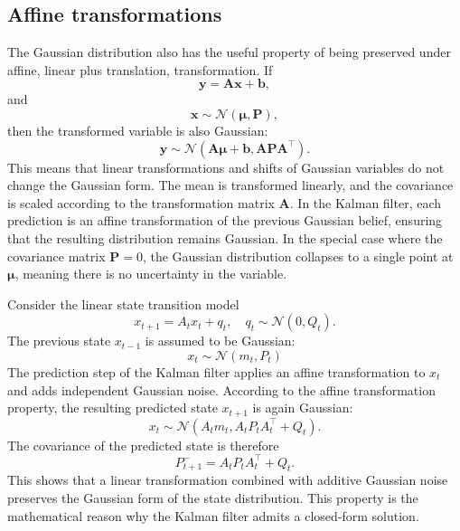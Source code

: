 \subsection*{Affine transformations}
The Gaussian distribution also has the useful property of being preserved under affine, linear plus translation, transformation. If 
\[
\mathbf{y} = \mathbf{A}\mathbf{x}+ \mathbf{b},
\]
and
\[
\mathbf{x} \sim \mathcal{N}(\boldsymbol{\mu}, \mathbf{P}),
\]
then the transformed variable is also Gaussian: 
\[
\mathbf{y} \sim \mathcal{N}(\mathbf{A}\boldsymbol{\mu}+\mathbf{b}, \mathbf{A}\mathbf{P}\mathbf{A^\top}).
\]
This means that linear transformations and shifts of Gaussian variables do not change the Gaussian form. The mean is transformed linearly, and the covariance is scaled according to the transformation matrix $\mathbf{A}$. 
In the Kalman filter, each prediction is an affine transformation of the previous Gaussian belief, ensuring that the resulting distribution remains Gaussian. In the special case where the covariance matrix $\mathbf{P}=0$, the Gaussian distribution collapses to a single point at $\boldsymbol{\mu}$, meaning there is no uncertainty in the variable. 

\begin{example}
    Consider the linear state transition model
    \[
    x_{t+1} = A_{t}x_{t} + q_{t}, \quad q_{t}\sim\mathcal{N}(0, Q_{t}).
    \]
    The previous state $x_{t-1}$ is assumed to be Gaussian: 
    \[
    x_{t} \sim \mathcal{N}(m_{t}, P_{t})
    \]
    The prediction step of the Kalman filter applies an affine transformation to $x_{t}$ and adds independent Gaussian noise. According to the affine transformation property, the resulting predicted state $x_{t+1}$ is again Gaussian:
    \[
    x_{t} \sim \mathcal{N}(A_{t}m_{t},  A_{t}P_{t}A^\top_{t} + Q_{t}).
    \]
    The covariance of the predicted state is therefore
    \[
    P^-_{t+1} = A_{t}P_{t}A^\top_{t} + Q_{t}.
    \]
    This shows that a linear transformation combined with additive Gaussian noise preserves the Gaussian form of the state distribution. This property is the mathematical reason why the Kalman filter admits a closed-form solution. 
\end{example}

